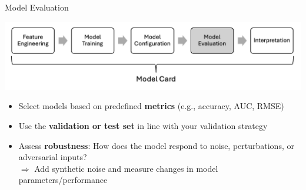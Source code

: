\documentclass[10pt,compress,t,notes=noshow, xcolor=table]{beamer}
\begin{document}

\begin{frame}[t]{Model Evaluation}
\label{model-evaluation}

\includegraphics[width=\linewidth, trim=0 60 0 0, clip]{figure_man/Modelling5.png}

\vspace{0.5em}
\begin{itemize}
  \item Select models based on predefined \textbf{metrics} (e.g., accuracy, AUC, RMSE)
  \item Use the \textbf{validation or test set} in line with your validation strategy
  \item Assess \textbf{robustness}: How does the model respond to noise, perturbations, or adversarial inputs?\\
  $\Rightarrow$ Add synthetic noise and measure changes in model parameters/performance
\end{itemize}
\end{frame}


\end{document}

